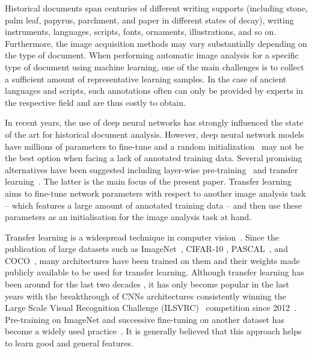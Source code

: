 \documentclass[journal]{IEEEtran}
\newcommand{\af}[1]{{\color{black}#1}}
\begin{document}
Historical documents span centuries of different writing supports (including stone, palm leaf, papyrus, parchment, and paper in different states of decay), writing instruments, languages, scripts, fonts, ornaments, illustrations, and so on. Furthermore, the image acquisition methods may vary substantially depending on the type of document. When performing automatic image analysis for a specific type of document using machine learning, one of the main challenges is to collect a sufficient amount of representative learning samples. In the case of ancient languages and scripts, such annotations often can only be provided by experts in the respective field and are thus costly to obtain.

In recent years, the use of deep neural networks has strongly influenced \af{the} state of the art for historical document analysis. However, deep neural network models have millions of parameters to fine-tune and a random initialization~\cite{glorot2010understanding} may not be the best option when facing a lack of annotated training data. 
Several promising alternatives have been suggested including layer-wise pre-training~\cite{hinton2006fast,alberti2017lda} and transfer learning~\cite{caruana1997multitask}. 
The latter is the main focus of the present paper. 
Transfer learning aims to fine-tune network parameters with respect to another image analysis task -- which features a large amount of annotated training data -- and then use these parameters as an initialisation for the image analysis task at hand.

Transfer learning is a widespread technique in computer vision~\cite{pan2010survey,thrun2012learning}.
Since the publication of large datasets such as ImageNet~\cite{imagenet_cvpr09}, CIFAR-10 \cite{krizhevsky2014cifar},
PASCAL~\cite{Everingham15}, and COCO~\cite{lin2014microsoft}, many architectures have been trained on them and their weights made publicly available to be used for transfer learning.
Although transfer learning has been around for the last two decades \cite{machinelearning}, it has only become popular in the last years with the breakthrough of \acp{CNN} architectures consistently winning the Large Scale Visual Recognition Challenge (ILSVRC)~\cite{imagenet_cvpr09} competition since 2012~\cite{krizhevsky2012imagenet}. 
Pre-training on ImageNet and successive fine-tuning on another dataset has become a widely used practice~\cite{huh2016makes,zeiler2014visualizing}.
It is generally believed that this approach helps to learn good and general features. 
\end{document}
